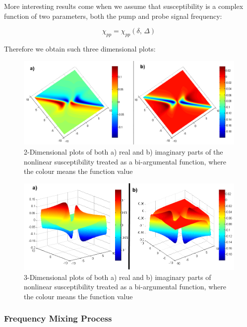 \documentclass[12pt,twoside,a4paper]{article}
\numberwithin{equation}{subsection}
\numberwithin{figure}{subsection}
\begin{document}
More interesting results come when we assume that susceptibility is a complex function of two parameters, both the pump and
probe signal frequency:

\begin{equation} \label{eq:pnp_2args}
  \chi_{pp} = \chi_{pp}(\delta , \,\Delta )
\end{equation}

Therefore we obtain such three dimensional plots:

\begin{figure} \label{fig:pnp_2d}
  \includegraphics[width=150mm]{img/pnp_2d.png}
  \caption{2-Dimensional plots of both a) real and b) imaginary parts of the nonlinear susceptibility treated as a bi-argumental
  function, where the colour means the function value}
\end{figure}

\begin{figure} \label{fig:pnp_3d}
  \includegraphics[width=150mm]{img/pnp_3d.png}
  \caption{3-Dimensional plots of both a) real and b) imaginary parts of nonlinear susceptibility treated as a bi-argumental
  function, where the colour means the function value}
\end{figure}

\subsubsection*{Frequency Mixing Process}
\end{document}
